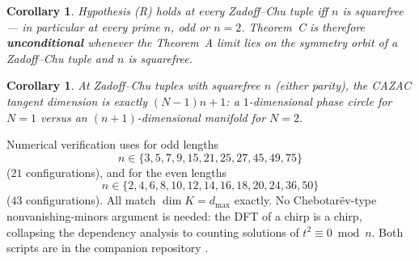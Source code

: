 \documentclass[11pt]{article}
\theoremstyle{plain}
\newtheorem{corollary}[theorem]{Corollary}
\theoremstyle{definition}
\theoremstyle{remark}
\begin{document}
\begin{corollary}\label{cor:D1}
Hypothesis (R) holds at every Zadoff--Chu tuple iff $n$ is squarefree ---
in particular at every prime $n$, odd or $n=2$. Theorem~C is therefore
\textbf{unconditional} whenever the Theorem~A limit lies on the symmetry
orbit of a Zadoff--Chu tuple and $n$ is squarefree.
\end{corollary}

\begin{corollary}\label{cor:D2}
At Zadoff--Chu tuples with squarefree $n$ (either parity), the CAZAC
tangent dimension is exactly $(N-1)n+1$: a $1$-dimensional phase circle for
$N=1$ versus an $(n+1)$-dimensional manifold for $N=2$.
\end{corollary}

Numerical verification uses  for
odd lengths
\[
n\in\{3,5,7,9,15,21,25,27,45,49,75\}
\]
($21$ configurations), and
 for the even lengths
\[
n\in\{2,4,6,8,10,12,14,16,18,20,24,36,50\}
\]
($43$ configurations). All match $\dim K=d_{\max}$ exactly. No
Chebotar\"ev-type nonvanishing-minors
argument is needed: the DFT of a chirp is a chirp, collapsing the
dependency analysis to counting solutions of $t^2\equiv0\bmod n$. Both
scripts are in the companion repository \cite{CazacAlgorithmRepo}.
\end{document}
